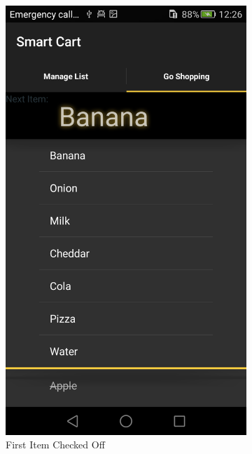 \begin{figure}[h]
\captionsetup{justification=centering}
\begin{subfigure}{0.475\textwidth} 
\centering 
\includegraphics[height= 0.3\textheight]{res/usermanual/firstItemChecked.png}
\caption{First Item Checked Off}
\label{fig:firstItemChecked}
\end{subfigure} \hspace{0.05\textwidth}
\begin{subfigure}{0.475\textwidth}

\end{subfigure}
\end{figure}
